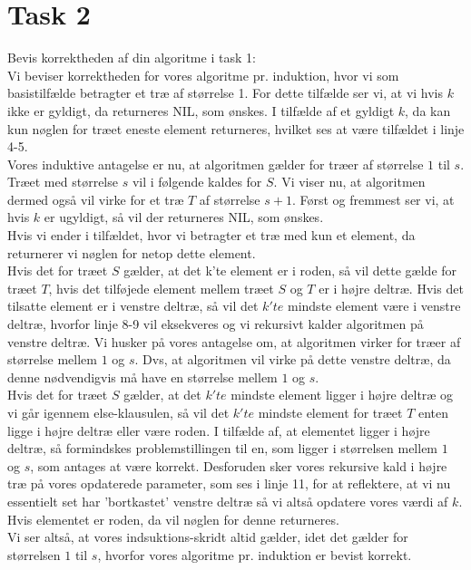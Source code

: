 \section{Task 2}

Bevis korrektheden af din algoritme i task 1:\\

Vi beviser korrektheden for vores algoritme pr. induktion, hvor vi som basistilfælde betragter et træ af størrelse 1. For dette tilfælde ser vi, at vi hvis $k$ ikke er gyldigt, da returneres NIL, som ønskes. I tilfælde af et gyldigt $k$, da kan kun nøglen for træet eneste element returneres, hvilket ses at være tilfældet i linje 4-5.\\
Vores induktive antagelse er nu, at algoritmen gælder for træer af størrelse $1$ til $s$. Træet med størrelse $s$ vil i følgende kaldes for $S$.
Vi viser nu, at algoritmen dermed også vil virke for et træ $T$ af størrelse $s+1$.
Først og fremmest ser vi, at hvis $k$ er ugyldigt, så vil der returneres NIL, som ønskes.\\
Hvis vi ender i tilfældet, hvor vi betragter et træ med kun et element, da returnerer vi nøglen for netop dette element.\\
Hvis det for træet $S$ gælder, at det k'te element er i roden, så vil dette gælde for træet $T$, hvis det tilføjede element mellem træet $S$ og $T$ er i højre deltræ. Hvis det tilsatte element er i venstre deltræ, så vil det $k'te$ mindste element være i venstre deltræ, hvorfor linje 8-9 vil eksekveres og vi rekursivt kalder algoritmen på venstre deltræ. Vi husker på vores antagelse om, at algoritmen virker for træer af størrelse mellem $1$ og $s$. Dvs, at algoritmen vil virke på dette venstre deltræ, da denne nødvendigvis må have en størrelse mellem $1$ og $s$. \\
Hvis det for træet $S$ gælder, at det $k'te$ mindste element ligger i højre deltræ og vi går igennem else-klausulen, så vil det $k'te$ mindste element for træet $T$ enten ligge i højre deltræ eller være roden. I tilfælde af, at elementet ligger i højre deltræ, så formindskes problemstillingen til en, som ligger i størrelsen mellem $1$ og $s$, som antages at være korrekt. Desforuden sker vores rekursive kald i højre træ på vores opdaterede parameter, som ses i linje 11, for at reflektere, at vi nu essentielt set har 'bortkastet' venstre deltræ så vi altså opdatere vores værdi af $k$.
Hvis elementet er roden, da vil nøglen for denne returneres.\\
Vi ser altså, at vores indsuktions-skridt altid gælder, idet det gælder for størrelsen $1$ til $s$, hvorfor vores algoritme pr. induktion er bevist korrekt. 

